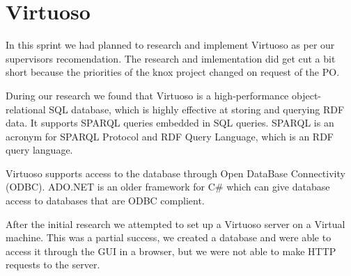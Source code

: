 \section{Virtuoso}
In this sprint we had planned to research and implement Virtuoso as per our supervisors recomendation.
The research and imlementation did get cut a bit short because the priorities of the knox project changed on request of the PO.

During our research we found that Virtuoso is a high-performance object-relational SQL database, which is highly effective at storing and querying RDF data. It supports SPARQL queries embedded in SQL queries. SPARQL is an acronym for SPARQL Protocol and RDF Query Language, which is an RDF query language.

Virtuoso supports access to the database through Open DataBase Connectivity (ODBC).
ADO.NET is an older framework for C\# which can give database access to databases that are ODBC complient.

After the initial research we attempted to set up a Virtuoso server on a Virtual machine. This was a partial success, we created a database and were able to access it through the GUI in a browser, but we were not able to make HTTP requests to the server.

